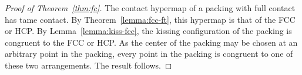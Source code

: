 \begin{proof}[Proof of Theorem~\ref{thm:fc}]  %
The contact hypermap of a  packing with full
  contact has tame contact.  By Theorem~\ref{lemma:fcc-ft}, this
  hypermap is that of the FCC or HCP.  By Lemma~\ref{lemma:kiss-fcc},
  the kissing configuration of the  packing is congruent to
  the FCC or HCP.  As the center of the packing may be chosen at an
  arbitrary point in the packing, every point in the packing is
  congruent to one of these two arrangements.  The result follows.
\end{proof}



